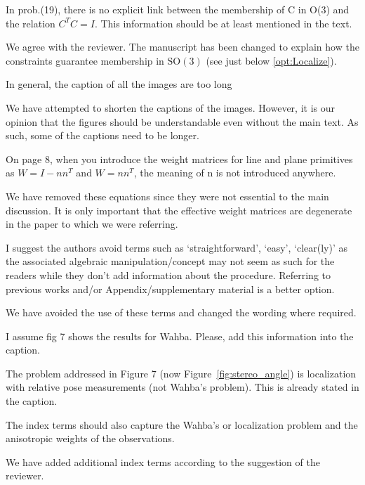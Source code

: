 In prob.(19), there is no explicit link between the membership of C in O(3) and the relation $C^T C = I$. This information should be at least mentioned in the text.
\begin{response}
    We agree with the reviewer. The manuscript has been changed to explain how the constraints guarantee membership in $\mbox{SO}(3)$ (see just below \eqref{opt:Localize}).
\end{response}

In general, the caption of all the images are too long 
\begin{response}
    We have attempted to shorten the captions of the images. However, it is our opinion that the figures should be understandable even without the main text. As such, some of the captions need to be longer.
\end{response} 

On page 8, when you introduce the weight matrices for line and plane primitives as $W=I-nn^T$ and $W=nn^T$, the meaning of n is not introduced anywhere. 
\begin{response}
    We have removed these equations since they were not essential to the main discussion. It is only important that the effective weight matrices are degenerate in the paper to which we were referring.
\end{response}

I suggest the authors avoid terms such as `straightforward', `easy', `clear(ly)' as the associated algebraic manipulation/concept may not seem as such for the readers while they don't add information about the procedure. Referring to previous works and/or Appendix/supplementary material is a better option. 
\begin{response}
    We have avoided the use of these terms and changed the wording where required.
\end{response}

I assume fig 7 shows the results for Wahba. Please, add this information into the caption.
\begin{response}
    The problem addressed in Figure 7 (now Figure~\ref{fig:stereo_angle}) is localization with relative pose measurements (not Wahba's problem). This is already stated in the caption.
\end{response}

The index terms should also capture the Wahba's or localization problem and the anisotropic weights of the observations.
\begin{response}
    We have added additional index terms according to the suggestion of the reviewer.
\end{response}

